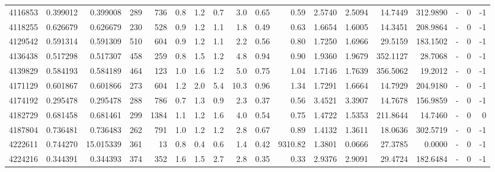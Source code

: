 \begin{tabular}{rrrrrrrrrrrrrrrlrr}
   4116853 & 0.399012 &   0.399008 &  289 &  736 &      0.8 &      1.2 &     0.7 &      3.0 &       0.65 &        0.59 &  2.5740 &  2.5094 &   14.7449 &  312.9890 &             - &        0 &         -1 \\
   4118255 & 0.626679 &   0.626679 &  230 &  528 &      0.9 &      1.2 &     1.1 &      1.8 &       0.49 &        0.63 &  1.6654 &  1.6005 &   14.3451 &  208.9864 &             - &        0 &         -1 \\
   4129542 & 0.591314 &   0.591309 &  510 &  604 &      0.9 &      1.2 &     1.1 &      2.2 &       0.56 &        0.80 &  1.7250 &  1.6966 &   29.5159 &  183.1502 &             - &        0 &         -1 \\
   4136438 & 0.517298 &   0.517307 &  458 &  259 &      0.8 &      1.5 &     1.2 &      4.8 &       0.94 &        0.90 &  1.9360 &  1.9679 &  352.1127 &   28.7068 &             - &        0 &         -1 \\
   4139829 & 0.584193 &   0.584189 &  464 &  123 &      1.0 &      1.6 &     1.2 &      5.0 &       0.75 &        1.04 &  1.7146 &  1.7639 &  356.5062 &   19.2012 &             - &        0 &         -1 \\
   4171129 & 0.601867 &   0.601866 &  273 &  604 &      1.2 &      2.0 &     5.4 &     10.3 &       0.96 &        1.34 &  1.7291 &  1.6664 &   14.7929 &  204.9180 &             - &        0 &         -1 \\
   4174192 & 0.295478 &   0.295478 &  288 &  786 &      0.7 &      1.3 &     0.9 &      2.3 &       0.37 &        0.56 &  3.4521 &  3.3907 &   14.7678 &  156.9859 &             - &        0 &         -1 \\
   4182729 & 0.681458 &   0.681461 &  299 & 1384 &      1.1 &      1.2 &     1.6 &      4.0 &       0.54 &        0.75 &  1.4722 &  1.5353 &  211.8644 &   14.7460 &             - &        0 &          0 \\
   4187804 & 0.736481 &   0.736483 &  262 &  791 &      1.0 &      1.2 &     1.2 &      2.8 &       0.67 &        0.89 &  1.4132 &  1.3611 &   18.0636 &  302.5719 &             - &        0 &         -1 \\
   4222611 & 0.744270 &  15.015339 &  361 &   13 &      0.8 &      0.4 &     0.6 &      1.4 &       0.42 &     9310.82 &  1.3801 &  0.0666 &   27.3785 &    0.0000 &             - &        0 &         -1 \\
   4224216 & 0.344391 &   0.344393 &  374 &  352 &      1.6 &      1.5 &     2.7 &      2.8 &       0.35 &        0.33 &  2.9376 &  2.9091 &   29.4724 &  182.6484 &             - &        0 &         -1 \\

\end{tabular}
